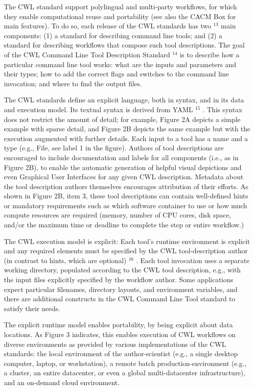 \documentclass[
]{article}
\begin{document}
The CWL standard support polylingual and multi-party workflows, for
which they enable computational reuse and portability (see also the CACM
Box for main features). To do so, each release of the CWL standards has
two \(^{13}\) main components: (1) a standard for describing command
line tools; and (2) a standard for describing workflows that compose
such tool descriptions. The goal of the CWL Command Line Tool
Description Standard \(^{14}\) is to describe how a particular command
line tool works: what are the inputs and parameters and their types; how
to add the correct flags and switches to the command line invocation;
and where to find the output files.

The CWL standards define an explicit language, both in syntax, and in
its data and execution model. Its textual syntax is derived from YAML
\(^{15}\) . This syntax does not restrict the amount of detail; for
example, Figure 2A depicts a simple example with sparse detail, and
Figure 2B depicts the same example but with the execution augmented with
further details. Each input to a tool has a name and a type (e.g., File,
see label 1 in the figure). Authors of tool descriptions are encouraged
to include documentation and labels for all components (i.e., as in
Figure 2B), to enable the automatic generation of helpful visual
depictions and even Graphical User Interfaces for any given CWL
description. Metadata about the tool description authors themselves
encourages attribution of their efforts. As shown in Figure 2B, item 3,
these tool descriptions can contain well-defined hints or mandatory
requirements such as which software container to use or how much compute
resources are required (memory, number of CPU cores, disk space, and/or
the maximum time or deadline to complete the step or entire workflow.)

The CWL execution model is explicit: Each tool's runtime environment is
explicit and any required elements must be specified by the CWL
tool-description author (in contrast to hints, which are optional)
\(^{16}\) . Each tool invocation uses a separate working directory,
populated according to the CWL tool description, e.g., with the input
files explicitly specified by the workflow author. Some applications
expect particular filenames, directory layouts, and environment
variables, and there are additional constructs in the CWL Command Line
Tool standard to satisfy their needs.

The explicit runtime model enables portability, by being explicit about
data locations. As Figure 3 indicates, this enables execution of CWL
workflows on diverse environments as provided by various implementations
of the CWL standards: the local environment of the author-scientist
(e.g., a single desktop computer, laptop, or workstation), a remote
batch production-environment (e.g., a cluster, an entire datacenter, or
even a global multi-datacenter infrastructure), and an on-demand cloud
environment.
\end{document}
